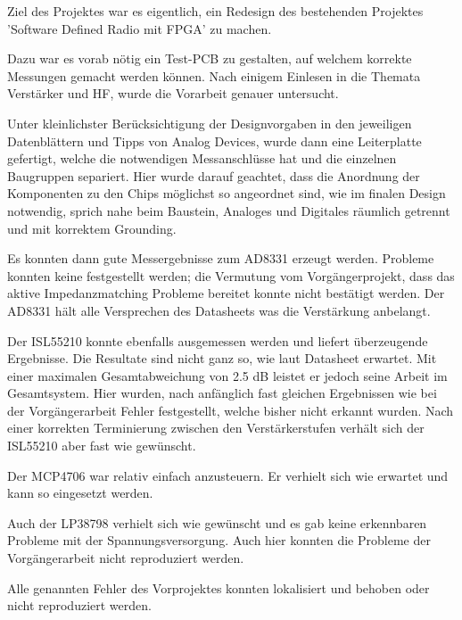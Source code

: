 Ziel des Projektes war es eigentlich, ein Redesign des bestehenden Projektes 'Software Defined Radio mit FPGA' zu machen.

Dazu war es vorab nötig ein Test-PCB zu gestalten, auf welchem korrekte Messungen gemacht werden können.
Nach einigem Einlesen in die Themata Verstärker und HF, wurde die Vorarbeit genauer untersucht.

Unter kleinlichster Berücksichtigung der Designvorgaben in den jeweiligen Datenblättern und Tipps von Analog Devices\cite{StayingWellGrounded2012}, wurde dann eine Leiterplatte gefertigt, welche die notwendigen Messanschlüsse hat und die einzelnen Baugruppen separiert. Hier wurde darauf geachtet, dass die Anordnung der Komponenten zu den Chips möglichst so angeordnet sind, wie im finalen Design notwendig, sprich nahe beim Baustein, Analoges und Digitales räumlich getrennt und mit korrektem Grounding.

Es konnten dann gute Messergebnisse zum AD8331 erzeugt werden. Probleme konnten keine festgestellt werden; die Vermutung vom Vorgängerprojekt, dass das aktive Impedanzmatching Probleme bereitet konnte nicht bestätigt werden. Der AD8331 hält alle Versprechen des Datasheets was die Verstärkung anbelangt.

Der ISL55210 konnte ebenfalls ausgemessen werden und liefert überzeugende Ergebnisse. Die Resultate sind nicht ganz so, wie laut Datasheet erwartet. Mit einer maximalen Gesamtabweichung von 2.5 dB leistet er jedoch seine Arbeit im Gesamtsystem. Hier wurden, nach anfänglich fast gleichen Ergebnissen wie bei der Vorgängerarbeit Fehler festgestellt, welche bisher nicht erkannt wurden. Nach einer korrekten Terminierung zwischen den Verstärkerstufen verhält sich der ISL55210 aber fast wie gewünscht.

Der MCP4706 war relativ einfach anzusteuern. Er verhielt sich wie erwartet und kann so eingesetzt werden.

Auch der LP38798 verhielt sich wie gewünscht und es gab keine erkennbaren Probleme mit der Spannungsversorgung. Auch hier konnten die Probleme der Vorgängerarbeit nicht reproduziert werden.

Alle genannten Fehler des Vorprojektes konnten lokalisiert und behoben oder nicht reproduziert werden.